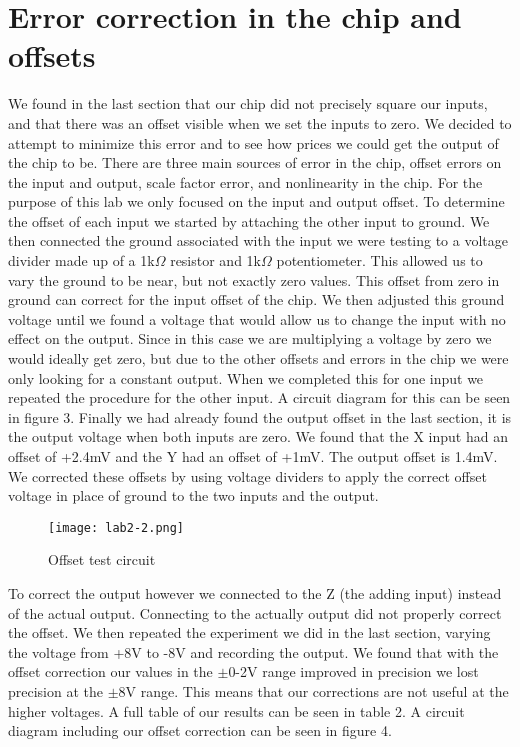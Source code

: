 \documentclass[prl,12pt,notitlepage,aps,onecolumn,superscriptaddress]{revtex4-1}
\newcommand{\ohm}{$\Omega$ }
\begin{document}
\section{Error correction in the chip and offsets}
We found in the last section that our chip did not precisely square our inputs, and that there was an offset visible when we set the inputs to zero. We decided to attempt to minimize this error and to see how prices we could get the output of the chip to be. There are three main sources of error in the chip, offset errors on the input and output, scale factor error, and nonlinearity in the chip. For the purpose of this lab we only focused on the input and output offset. To determine the offset of each input we started by attaching the other input to ground. We then connected the ground associated with the input we were testing to a voltage divider made up of a 1k\ohm resistor and 1k\ohm potentiometer. This allowed us to vary the ground to be near, but not exactly zero values. This offset from zero in ground can correct for the input offset of the chip. We then adjusted this ground voltage until we found a voltage that would allow us to change the input with no effect on the output. Since in this case we are multiplying a voltage by zero we would ideally get zero, but due to the other offsets and errors in the chip we were only looking for a constant output. When we completed this for one input we repeated the procedure for the other input. A circuit diagram for this can be seen in figure 3. Finally we had already found the output offset in the last section, it is the output voltage when both inputs are zero. We found that the X input had an offset of +2.4mV and the Y had an offset of +1mV. The output offset is 1.4mV. We corrected these offsets by using voltage dividers to apply the correct offset voltage in place of ground to the two inputs and the output.

\begin{figure}[h]
\begin{center}
\texttt{[image: lab2-2.png]}
\end{center}
\caption{\label{fig:pic} Offset test circuit}
\end{figure}

To correct the output however we connected to the Z (the adding input) instead of the actual output. Connecting to the actually output did not properly correct the offset. We then repeated the experiment we did in the last section, varying the voltage from +8V to -8V and recording the output. We found that with the offset correction our values in the $\pm$0-2V range improved in precision we lost precision at the $\pm$8V range. This means that our corrections are not useful at the higher voltages. A full table of our results can be seen in table 2. A circuit diagram including our offset correction can be seen in figure 4.
\end{document}
